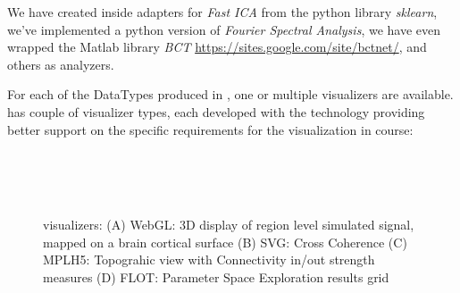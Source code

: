       We have created inside \TVB adapters for \emph{Fast ICA} from the
      python library \emph{sklearn},  we've implemented a python version of
      \emph{Fourier Spectral Analysis},  we have even wrapped the Matlab
      library \emph{BCT} \url{https://sites.google.com/site/bctnet/}, and
      others as analyzers.

      For each of the DataTypes produced in \TVB, one or multiple
      visualizers are available.   \TVB has couple of  visualizer types,
      each developed with the technology providing better support on the
      specific requirements for the visualization in course:

       \begin{figure}[!htbp]
          \\
          \\
          \\
          \caption{\TVB visualizers: 
          (A) WebGL: 3D display of region level simulated signal, mapped on a brain cortical surface
          (B) SVG: Cross Coherence
          (C) MPLH5:  Topograhic view with Connectivity in/out strength measures
          (D) FLOT: Parameter Space Exploration results grid}
        \label{fig:visualizers}
      \end{figure}
  
